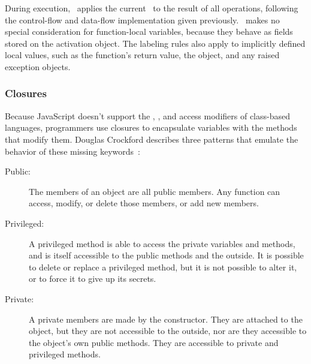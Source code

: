 During execution, \FlowCore\ applies the current \pclabel\ to the result of all operations, following the control-flow and data-flow implementation given previously.
\FlowCore\ makes no special consideration for function-local variables, because they behave as fields stored on the activation object.
The labeling rules also apply to implicitly defined local values, such as the function's return value, the  object, and any raised exception objects.

\begin{comment}
function foo() {
  console.log(arguments.caller)        // undefined
  console.log(arguments.length)        // length of the argumets
  console.log(Function.caller)         // null
  console.log(foo.caller)              // code of parent function
  console.log(arguments.callee.caller) // code of parent function
  console.log(arguments.callee)        // code of self
  console.log(typeof arguments)        // object
}

foo(1,2,3,4)
\end{comment}

\subsubsection{Closures}


Because JavaScript doesn't support the , , and  access modifiers of class-based languages, programmers use closures to encapsulate variables with the methods that modify them.
Douglas Crockford describes three patterns that emulate the behavior of these missing keywords~\cite{crockford+01}:

\begin{description}
  \item[Public:]
    The members of an object are all public members. Any function can access, modify, or delete those members, or add new members.
  \item[Privileged:]
    A privileged method is able to access the private variables and methods, and is itself accessible to the public methods and the outside.
    It is possible to delete or replace a privileged method, but it is not possible to alter it, or to force it to give up its secrets.
  \item[Private:]
    A private members are made by the constructor.
    They are attached to the object, but they are not accessible to the outside, nor are they accessible to the object's own public methods.
    They are accessible to private and privileged methods.
\end{description}


